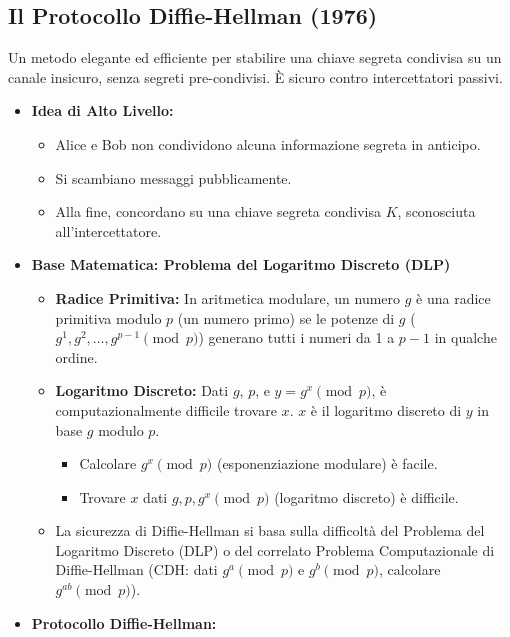 \documentclass{article}
\begin{document}
\subsection{Il Protocollo Diffie-Hellman (1976)}
Un metodo elegante ed efficiente per stabilire una chiave segreta condivisa su un canale insicuro, senza segreti pre-condivisi. È sicuro contro intercettatori passivi.
\begin{itemize}
    \item \textbf{Idea di Alto Livello:}
        \begin{itemize}
            \item Alice e Bob non condividono alcuna informazione segreta in anticipo.
            \item Si scambiano messaggi pubblicamente.
            \item Alla fine, concordano su una chiave segreta condivisa $K$, sconosciuta all'intercettatore.
        \end{itemize}
    \item \textbf{Base Matematica: Problema del Logaritmo Discreto (DLP)}
        \begin{itemize}
            \item \textbf{Radice Primitiva:} In aritmetica modulare, un numero $g$ è una radice primitiva modulo $p$ (un numero primo) se le potenze di $g$ ($g^1, g^2, \dots, g^{p-1} \pmod{p}$) generano tutti i numeri da 1 a $p-1$ in qualche ordine.
            \item \textbf{Logaritmo Discreto:} Dati $g$, $p$, e $y = g^x \pmod{p}$, è computazionalmente difficile trovare $x$. $x$ è il logaritmo discreto di $y$ in base $g$ modulo $p$.
                \begin{itemize}
                    \item Calcolare $g^x \pmod{p}$ (esponenziazione modulare) è facile.
                    \item Trovare $x$ dati $g, p, g^x \pmod{p}$ (logaritmo discreto) è difficile.
                \end{itemize}
            \item La sicurezza di Diffie-Hellman si basa sulla difficoltà del Problema del Logaritmo Discreto (DLP) o del correlato Problema Computazionale di Diffie-Hellman (CDH: dati $g^a \pmod p$ e $g^b \pmod p$, calcolare $g^{ab} \pmod p$).
        \end{itemize}
    \item \textbf{Protocollo Diffie-Hellman:}
        \begin{enumerate}

\end{enumerate}
\end{itemize}
\end{document}

